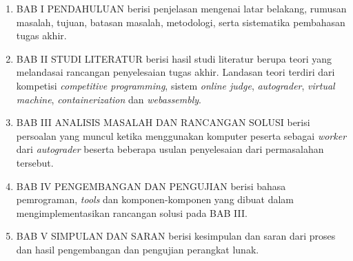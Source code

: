 \begin{enumerate}
	\item BAB I PENDAHULUAN berisi penjelasan mengenai latar belakang, rumusan masalah, tujuan, batasan masalah, metodologi, serta sistematika pembahasan tugas akhir.
	\item BAB II STUDI LITERATUR berisi hasil studi literatur berupa teori yang melandasai rancangan penyelesaian tugas akhir. Landasan teori terdiri dari kompetisi \textit{competitive programming}, sistem \textit{online judge}, \textit{autograder}, \textit{virtual machine}, \textit{containerization} dan \textit{webassembly}.
	\item BAB III ANALISIS MASALAH DAN RANCANGAN SOLUSI berisi persoalan yang muncul ketika menggunakan komputer peserta sebagai \textit{worker} dari \textit{autograder} beserta beberapa usulan penyelesaian dari permasalahan tersebut.
	\item BAB IV PENGEMBANGAN DAN PENGUJIAN berisi bahasa pemrograman, \textit{tools} dan komponen-komponen yang dibuat dalam mengimplementasikan rancangan solusi pada BAB III.
	\item BAB V SIMPULAN DAN SARAN berisi kesimpulan dan saran dari proses dan hasil pengembangan dan pengujian perangkat lunak.
\end{enumerate}
